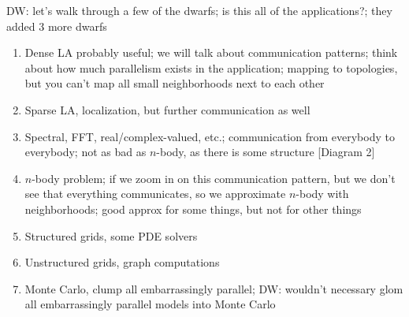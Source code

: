 DW: let's walk through a few of the dwarfs; is this all of the applications?; they added 3 more dwarfs
\begin{enumerate}
    \item Dense LA probably useful; we will talk about communication patterns; think about how much parallelism exists in the application; mapping to topologies, but you can't map all small neighborhoods next to each other
    \item Sparse LA, localization, but further communication as well
    \item Spectral, FFT, real/complex-valued, etc.; communication from everybody to everybody; not as bad as \( n \)-body, as there is some structure [Diagram 2]
    \item \( n \)-body problem; if we zoom in on this communication pattern, but we don't see that everything communicates, so we approximate \( n \)-body with neighborhoods; good approx for some things, but not for other things
    \item Structured grids, some PDE solvers
    \item Unstructured grids, graph computations
    \item Monte Carlo, clump all embarrassingly parallel; DW: wouldn't necessary glom all embarrassingly parallel models into Monte Carlo
\end{enumerate}

{}



